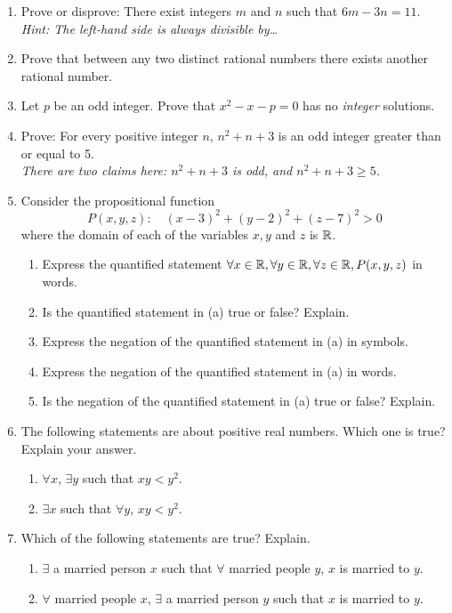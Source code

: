 \begin{exercises}{}{}
\begin{enumerate}
	\item Prove or disprove: There exist integers $m$ and $n$ such that $6m-3n=11$.\\
  \emph{Hint: The left-hand side is always  divisible by\ldots}
  
	\item Prove that between any two distinct rational numbers there exists another rational number.

	\item Let $p$ be an odd integer. Prove that $x^2-x-p=0$ has no \emph{integer} solutions.
   
	\item Prove: For every positive integer $n$, $n^2+n+3$ is an odd integer greater than or equal to 5.\\
	\emph{There are two claims here: $n^2+n+3$ is odd, and $n^2+n+3\ge 5$.}

  
	\item Consider the propositional function
  \[P(x,y,z):\quad (x-3)^2+(y-2)^2+(z-7)^2>0\]
  where the domain of each of the variables $x,y$ and $z$ is $\mathbb{R}$.
  \begin{enumerate}
    \item Express the quantified statement $\forall x\in\mathbb{R},\forall y\in\mathbb{R},\forall z\in\mathbb{R}, P(x,y,z)$ in words.
    \item Is the quantified statement in (a) true or false? Explain.
    \item Express the negation of the quantified statement in (a) in symbols.
    \item Express the negation of the quantified statement in (a) in words.
    \item Is the negation of the quantified statement in (a) true or false? Explain.
  \end{enumerate}
  
	\item The following statements are about positive real numbers. Which one is true? Explain your answer.
	\begin{enumerate}
	  \item $\forall x$, $\exists y$ such that $xy<y^2$.
	  \item $\exists x$ such that $\forall y$, $xy<y^2$.
	\end{enumerate}

	\item Which of the following statements are true? Explain.
	\begin{enumerate}
	  \item $\exists$ a married person $x$ such that $\forall$ married people $y$, $x$ is married to $y$.
	  \item $\forall$ married people $x$, $\exists$ a married person $y$ such that $x$ is married to $y$.
	\end{enumerate}
	

\end{enumerate}
\end{exercises}
